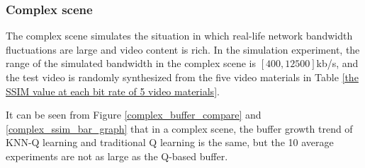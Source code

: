 \documentclass[twocolumn]{article}
\begin{document}
\subsubsection{Complex scene}
The complex scene simulates the situation in which real-life network 
bandwidth fluctuations are large and video content is rich. 
In the simulation experiment, the range of the simulated bandwidth in 
the complex scene is $\left[400,12500\right]$kb/s, and the test video is 
randomly synthesized from the five video materials in Table \ref{the SSIM value at each bit rate of 5 video materials}.

It can be seen from Figure \ref{complex_buffer_compare} and \ref{complex_ssim_bar_graph} that in a complex scene, 
the buffer growth trend of KNN-Q learning and traditional Q learning is the same, 
but the 10 average experiments are not as large as the Q-based buffer.
\end{document}
